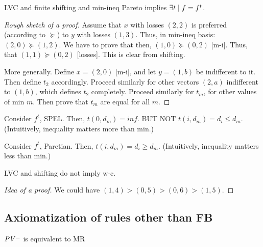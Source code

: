 \documentclass[version=3.21, pagesize, twoside=off, bibliography=totoc, DIV=calc, fontsize=12pt, a4paper]{scrartcl}
\begin{document}
\begin{conjecture}
	LVC and finite shifting and min-ineq Pareto implies $\exists t \suchthat f = f^t$.
\end{conjecture}
\begin{proof}[Rough sketch of a proof]
	Assume that $x$ with losses $(2, 2)$ is preferred (according to $\succeq$) to $y$ with losses $(1, 3)$.
	Thus, in min-ineq basis: $(2, 0) \succeq (1, 2)$.
	We have to prove that then, $(1, 0) \succeq (0, 2)$ [m-i].
	Thus, that $(1, 1) \succeq (0, 2)$ [losses].
	This is clear from shifting.
	
	More generally.
	Define $x = (2, 0)$ [m-i], and let $y = (1, b)$ be indifferent to it. Then define $t_2$ accordingly. Proceed similarly for other vectors $(2, a)$ indifferent to $(1, b)$, which defines $t_2$ completely. Proceed similarly for $t_m$, for other values of min $m$. Then prove that $t_m$ are equal for all $m$.
\end{proof}

\begin{conjecture}
	Consider $f^t$, SPEL. Then, $t(0, d_m) = inf$. BUT NOT $t(i, d_m) = d_i ≤ d_m$. (Intuitively, inequality matters more than min.)
\end{conjecture}
\begin{conjecture}
	Consider $f^t$, Paretian. Then, $t(i, d_m) = d_i ≥ d_m$. (Intuitively, inequality matters less than min.)
\end{conjecture}

\begin{conjecture}
	LVC and shifting do not imply w-c.
\end{conjecture}
\begin{proof}[Idea of a proof]
%	
	
	We could have $(1, 4) > (0, 5) > (0, 6) > (1, 5)$.
\end{proof}

\subsection{Axiomatization of rules other than FB}
$\mathit{PV^=}$ is equivalent to MR
\end{document}
